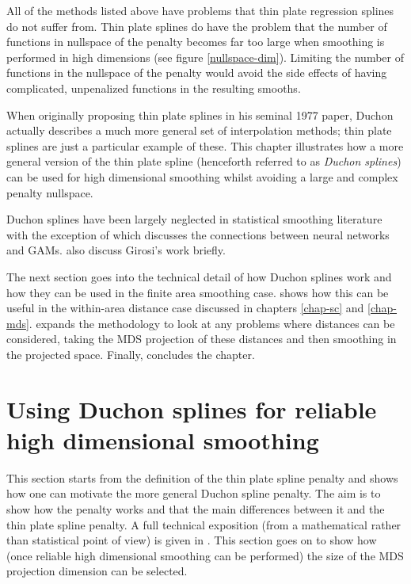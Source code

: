 All of the methods listed above have problems that thin plate regression splines do not suffer from. Thin plate splines do have the problem that the number of functions in nullspace of the penalty becomes far too large when smoothing is performed in high dimensions (see figure \ref{nullspace-dim}). Limiting the number of functions in the nullspace of the penalty would avoid the side effects of having complicated, unpenalized functions in the resulting smooths. 

When originally proposing thin plate splines in his seminal 1977 paper, Duchon actually describes a much more general set of interpolation methods; thin plate splines are just a particular example of these. This chapter illustrates how a more general version of the thin plate spline (henceforth referred to as \textit{Duchon splines}) can be used for high dimensional smoothing whilst avoiding a large and complex penalty nullspace. 

Duchon splines have been largely neglected in statistical smoothing literature with the exception of  which discusses the connections between neural networks and GAMs.  also discuss Girosi's work briefly.

The next section goes into the technical detail of how Duchon splines work and how they can be used in the finite area smoothing case.  shows how this can be useful in the within-area distance case discussed in chapters \ref{chap-sc} and \ref{chap-mds}.  expands the methodology to look at any problems where distances can be considered, taking the MDS projection of these distances and then smoothing in the projected space. Finally,  concludes the chapter.

\section{Using Duchon splines for reliable high dimensional smoothing}

This section starts from the definition of the thin plate spline penalty and shows how one can motivate the more general Duchon spline penalty. The aim is to show how the penalty works and that the main differences between it and the thin plate spline penalty. A full technical exposition (from a mathematical rather than statistical point of view) is given in . This section goes on to show how (once reliable high dimensional smoothing can be performed) the size of the MDS projection dimension can be selected.

